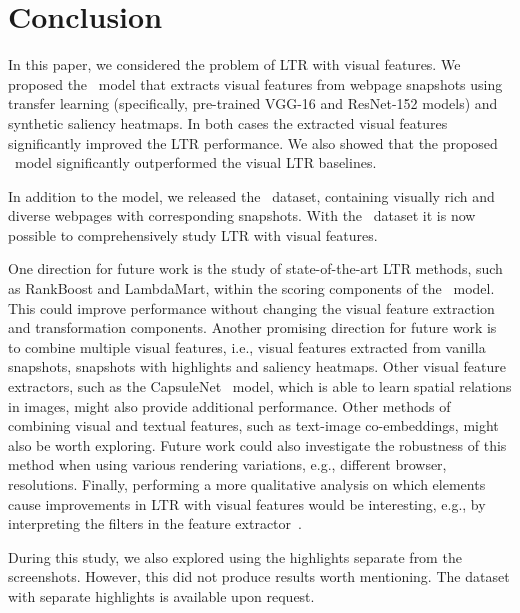 
\section{Conclusion}
In this paper, we considered the problem of \ac{LTR} with visual features.
We proposed the \modelname~model that extracts visual features from webpage snapshots
using transfer learning (specifically, pre-trained VGG-16 and ResNet-152 models) and synthetic saliency heatmaps.
In both cases the extracted visual features significantly improved the \ac{LTR} performance.
We also showed that the proposed \modelname~model significantly outperformed the visual \ac{LTR} baselines.

In addition to the model, we released the \datasetname~dataset, containing visually rich and diverse webpages with corresponding snapshots.
With the \datasetname~dataset it is now possible to comprehensively study \ac{LTR} with visual features.

One direction for future work is the study of state-of-the-art \ac{LTR} methods, such as RankBoost and LambdaMart, within the scoring components of the \modelname~model.
This could improve performance without changing the visual feature extraction and transformation components.
Another promising direction for future work is to combine multiple visual features,
i.e., visual features extracted from vanilla snapshots, snapshots with highlights and saliency heatmaps. Other visual feature extractors, such as the CapsuleNet~\cite{sabour2017dynamic} model, which is able to learn spatial relations in images, might also provide additional performance. Other methods of combining visual and textual features, such as text-image co-embeddings, might also be worth exploring. 
Future work could also investigate the robustness of this method when using various rendering variations, e.g., different browser, resolutions. 
Finally, performing a more qualitative analysis on which elements cause improvements in \ac{LTR} with visual features would be interesting, e.g., by interpreting the filters in the feature extractor~\cite{olah2018the}. 

During this study, we also explored using the highlights separate from the screenshots. 
However, this did not produce results worth mentioning. 
The dataset with separate highlights is available upon request. 
\fi